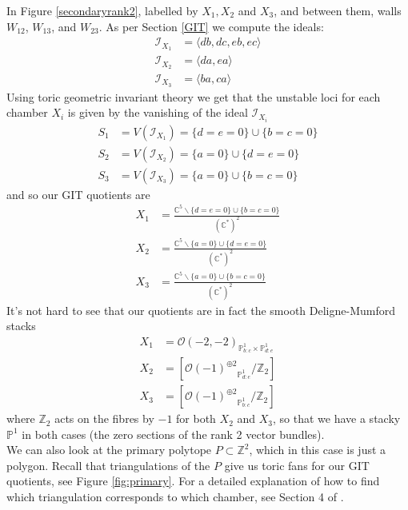 \documentclass[oneside]{amsart}
\theoremstyle{definition}
\theoremstyle{definition}
\theoremstyle{definition}
\theoremstyle{definition}
\newcommand{\CC}{\mathbb{C}}
\newcommand{\PP}{\mathbb{P}}
\newcommand{\Z}{\mathbb{Z}}
\begin{document}
\newline
In Figure \ref{secondaryrank2}, labelled by $X_1, X_2$ and $X_3$, and between them, walls $W_{12}$, $W_{13}$, and $W_{23}$. As per Section \ref{GIT} we compute the ideals:
\begin{align*}
    \mathcal{I}_{X_1} &= \langle db, dc, eb, ec \rangle \\
    \mathcal{I}_{X_2} &= \langle da, ea \rangle \\
    \mathcal{I}_{X_3} &= \langle ba, ca \rangle
\end{align*}
Using toric geometric invariant theory we get that the unstable loci for each chamber $X_i$ is given by the vanishing of the ideal $ \mathcal{I}_{X_i}$
\begin{align*}
    S_1 &= V(\mathcal{I}_{X_1}) = \{  d= e= 0\} \cup \{ b=c=0\} \\
    S_2 &= V(\mathcal{I}_{X_2}) = \{ a= 0 \} \cup \{ d = e= 0\} \\
    S_3 &= V(\mathcal{I}_{X_3}) = \{ a= 0 \} \cup \{  b= c= 0\}
\end{align*}
and so our GIT quotients are
\begin{align*}
    X_1 &= \frac{\CC^5 \backslash \{  d= e= 0\} \cup \{ b=c=0\} }{ (\CC^*)^2}\\
    X_2 &= \frac{\CC^5 \backslash \{  a= 0\} \cup \{ d = e= 0\} }{ (\CC^*)^2} \\
    X_3 &= \frac{\CC^5 \backslash \{ a= 0 \} \cup \{  b= c= 0\} }{ (\CC^*)^2}
\end{align*}
It's not hard to see that our quotients are in fact the smooth Deligne-Mumford stacks
\begin{align*}
    X_1 &= {\mathcal{O} (-2, -2)}_{\PP^1_{b:c} \times \PP^1_{d:e}} \\
    X_2 &= \left[{\mathcal{O}(-1)^{\oplus 2}}_{\PP^1_{d:e}} / \Z_2 \right] \\
    X_3 &= \left[{\mathcal{O}(-1)^{\oplus 2}}_{\PP^1_{b:c}} / \Z_2 \right]
\end{align*}
where $\Z_2$ acts on the fibres by $-1$ for both $X_2$ and $X_3$, so that we have a stacky $\PP^1$ in both cases (the zero sections of the rank 2 vector bundles). \\
\newline
\noindent
We can also look at the primary polytope $P \subset \Z^2$, which in this case is just a polygon. Recall that triangulations of the $P$ give us toric fans for our GIT quotients, see Figure \ref{fig:primary}. For a detailed explanation of how to find which triangulation corresponds to which chamber, see Section 4 of \cite{coates2018crepant}.
\end{document}

